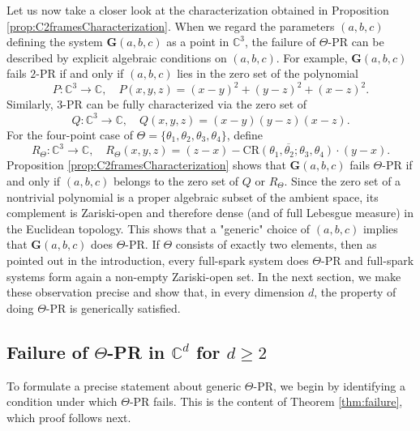 \documentclass[reqno,a4paper,11pt]{amsart}
\numberwithin{equation}{section}
\def\C{{\mathbb C}}
\newcommand\1{\mathds{1}}
\begin{document}
Let us now take a closer look at the characterization obtained in Proposition \ref{prop:C2framesCharacterization}. When we regard the parameters $(a,b,c)$ defining the system $\mathbf{G}(a,b,c)$ as a point in $\C^3$, the failure of $\Theta$-PR can be described by explicit algebraic conditions on $(a,b,c)$. For example, $\mathbf{G}(a,b,c)$ fails $2$-PR if and only if $(a,b,c)$ lies in the zero set of the polynomial
$$
P : \C^3 \to \C, \quad P(x,y,z)=(x-y)^2+(y-z)^2+(x-z)^2.
$$
Similarly, $3$-PR can be fully characterized via the zero set of 
$$
Q : \C^3 \to \C, \quad Q(x,y,z) = (x-y)(y-z)(x-z).
$$
For the four-point case of $\Theta=\{\theta_1,\theta_2,\theta_3,\theta_4\}$, define
$$
R_\Theta : \C^3 \to \C, \quad R_\Theta(x,y,z) = (z-x) - \overline{\mathrm{CR}(\theta_1,\theta_2;\theta_3,\theta_4)} \cdot (y-x).
$$
Proposition \ref{prop:C2framesCharacterization} shows that $\mathbf{G}(a,b,c)$ fails $\Theta$-PR if and only if $(a,b,c)$ belongs to the zero set of $Q$ or $R_\Theta$. 
Since the zero set of a nontrivial polynomial is a proper algebraic subset of the ambient space, its complement is Zariski-open and therefore dense (and of full Lebesgue measure) in the Euclidean topology. This shows that a "generic" choice of $(a,b,c)$ implies that $\mathbf{G}(a,b,c)$ does $\Theta$-PR. If $\Theta$ consists of exactly two elements, then as pointed out in the introduction, every full-spark system does $\Theta$-PR and full-spark systems form again a non-empty Zariski-open set. In the next section, we make these observation precise and show that, in every dimension $d$, the property of doing $\Theta$-PR is generically satisfied.

\subsection{Failure of $\Theta$-PR in $\C^d$ for $d\geq 2$}\label{sec:failure}

To formulate a precise statement about generic $\Theta$-PR, we begin by identifying a condition under which $\Theta$-PR fails. This is the content of Theorem \ref{thm:failure}, which proof follows next.
\end{document}
